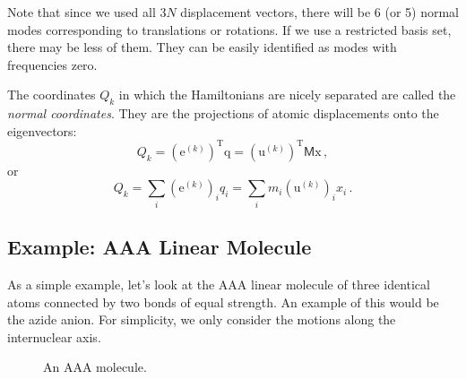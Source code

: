 \documentclass{article}
\theoremstyle{plain}\theoremheaderfont{\normalfont\itshape}\theorembodyfont{\rmfamily}\theoremseparator{.}\newtheorem*{rem}{Remark}\newtheorem*{ex}{Example}\newtheorem*{proof}{Proof}\newtheorem*{altp}{Alternative proof}
\theoremstyle{plain}\theoremheaderfont{\normalfont\bfseries}\theorembodyfont{\rmfamily}\theoremseparator{.}\newtheorem{thm}{Theorem}[section]\newtheorem{lem}[thm]{Lemma}\newtheorem{prop}[thm]{Proposition}\newtheorem*{cor}{Corollary}\newtheorem{defn}[thm]{Definition}\newtheorem{clm}[thm]{Claim}\newtheorem{clminproof}{Claim}
\theoremstyle{break}\theoremheaderfont{\normalfont\itshape}\theorembodyfont{\rmfamily}\theoremseparator{.\medskip}\newtheorem*{proofskip}{Proof}\newtheorem*{exs}{Examples}\newtheorem*{rems}{Remarks}
\theoremstyle{break}\theoremheaderfont{\normalfont\bfseries}\theorembodyfont{\rmfamily}\theoremseparator{.\medskip}\newtheorem{lemskip}[thm]{Lemma}\newtheorem{defnskip}[thm]{Definition}\newtheorem{propskip}[thm]{Proposition}\newtheorem{thmskip}[thm]{Theorem}
\numberwithin{equation}{section}
\newcommand{\tp}{^\mathrm{T}}
\newcommand{\vb}[1]{\bm{\mathrm{#1}}}
\begin{document}
    Note that since we used all \(3N\) displacement vectors, there will be 6 (or 5) normal modes corresponding to translations or rotations. If we use a restricted basis set, there may be less of them. They can be easily identified as modes with frequencies zero.

    The coordinates \(Q_k\) in which the Hamiltonians are nicely separated are called the \textit{normal coordinates}. They are the projections of atomic displacements onto the eigenvectors:
    \begin{equation}
        Q_k=(\vb{e}^{(k)})\tp \vb{q} = (\vb{u}^{(k)})\tp \mathsf{M} \vb{x}\,,
    \end{equation}
    or
    \begin{equation}
        Q_k = \sum_i (\vb{e}^{(k)})_i q_i = \sum_i m_i (\vb{u}^{(k)})_i x_i\,.
    \end{equation}

    \subsection{Example: AAA Linear Molecule}
    As a simple example, let's look at the AAA linear molecule of three identical atoms connected by two bonds of equal strength. An example of this would be the azide anion. For simplicity, we only consider the motions along the internuclear axis.

    \begin{figure}[ht!]
        \centering
        \caption{An AAA molecule.}
    \end{figure}
\end{document}
